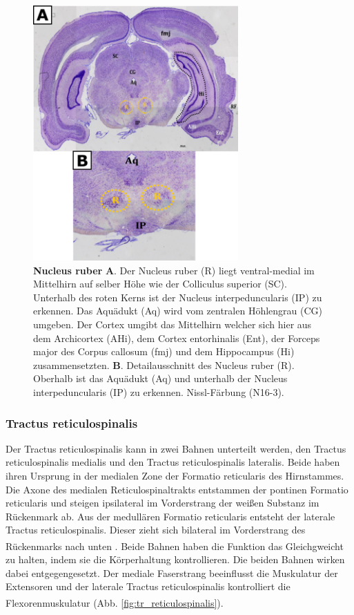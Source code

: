 \documentclass[12pt,a4paper,pdftex]{article}
\begin{document}
\begin{figure}[H]
    \centering
    \includegraphics[width=0.7\textwidth]{pictures/Bilder_Laura/red_nucleus_N16_3P_025x.png}
    \caption[Nucleus ruber]{\textbf{Nucleus ruber} \textbf{A}. Der Nucleus ruber (R) liegt ventral-medial im Mittelhirn auf selber Höhe wie der Colliculus superior (SC). Unterhalb des roten Kerns ist der Nucleus interpeduncularis (IP) zu erkennen. Das Aquädukt (Aq) wird vom zentralen Höhlengrau (CG) umgeben. Der Cortex umgibt das Mittelhirn welcher sich hier aus dem  Archicortex (AHi), dem Cortex entorhinalis (Ent), der Forceps major des Corpus callosum (fmj) und dem Hippocampus (Hi) zusammensetzten. \textbf{B}. Detailausschnitt des Nucleus ruber (R). Oberhalb ist das Aquädukt (Aq) und unterhalb der Nucleus interpeduncularis (IP) zu erkennen. Nissl-Färbung (N16-3).}
    \label{fig:roter_Kern}
\end{figure}

\subsubsection{Tractus reticulospinalis} 
Der Tractus reticulospinalis kann in zwei Bahnen unterteilt werden, den Tractus reticulospinalis medialis und den Tractus reticulospinalis lateralis. Beide haben ihren Ursprung in der medialen Zone der Formatio reticularis des Hirnstammes. Die Axone des medialen Reticulospinaltrakts entstammen der pontinen Formatio reticularis und steigen ipsilateral im Vorderstrang der weißen Substanz im Rückenmark ab. Aus der medullären Formatio reticularis entsteht der laterale Tractus reticulospinalis. Dieser zieht sich bilateral im Vorderstrang des Rückenmarks nach unten \textsuperscript{\cite[8]{crossman2014neuroanatomy}}. Beide Bahnen haben die Funktion das Gleichgweicht zu halten, indem sie die Körperhaltung kontrollieren. Die beiden Bahnen wirken dabei entgegengesetzt. Der mediale Faserstrang beeinflusst die Muskulatur der Extensoren und der laterale Tractus reticulospinalis kontrolliert die Flexorenmuskulatur \textsuperscript{\cite[14]{neurowissenschaften_baer}}(Abb. \ref{fig:tr_reticulospinalis}).
\end{document}
